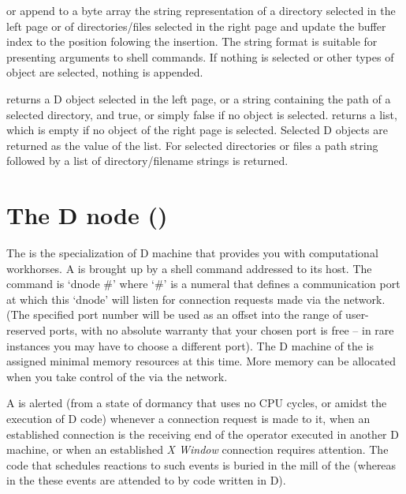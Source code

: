 \begin{description}
   or  append to a byte array the string
  representation of a directory selected in the left page or of
  directories/files selected in the right page and update the buffer
  index to the position folowing the insertion. The string format is
  suitable for presenting arguments to shell commands. If nothing is
  selected or other types of object are selected, nothing is appended.

   returns a D object selected in the left page, or a
  string containing the path of a selected directory, and true, or
  simply false if no object is selected.  returns a
  list, which is empty if no object of the right page is
  selected. Selected D objects are returned as the value of the
  list. For selected directories or files a path string followed by a
  list of directory/filename strings is returned.
\end{description}

\section{The D node ()}\label{sec:dnode}

The  is the specialization of D machine that provides you
with computational workhorses. A  is brought up by a
shell command addressed to its host. The command is `dnode \#' where
`\#' is a numeral that defines a communication port at which this
`dnode' will listen for connection requests made via the network. (The
specified port number will be used as an offset into the range of
user-reserved ports, with no absolute warranty that your chosen port
is free -- in rare instances you may have to choose a different
port). The D machine of the  is assigned minimal memory
resources at this time. More memory can be allocated when you take
control of the  via the network.

A  is alerted (from a state of dormancy that uses no CPU
cycles, or amidst the execution of D code) whenever a connection
request is made to it, when an established connection is the receiving
end of the  operator executed in another D machine, or when
an established \emph{X Window} connection requires attention. The code
that schedules reactions to such events is buried in the mill of the
 (whereas in the  these events are attended to
by code written in D).

